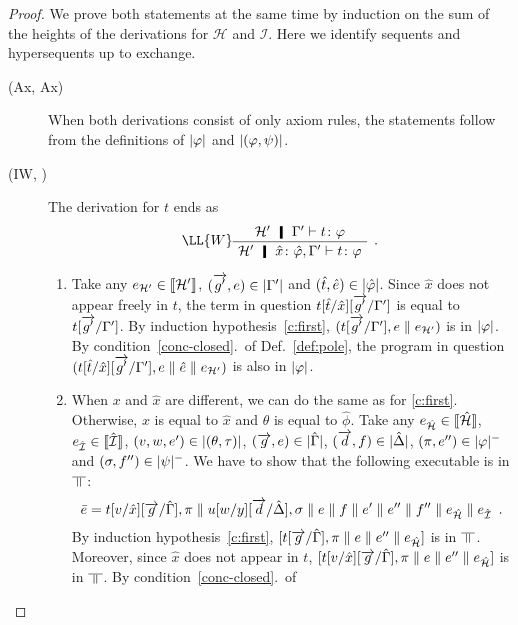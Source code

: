 \begin{proof}
 We prove both statements at the same time by induction on the sum of
 the heights of the derivations for $\mathcal H$ and $\mathcal I$.  Here
 we identify sequents and hypersequents up to exchange.
  \begin{description}
  \item[(Ax, Ax)] When both derivations consist of only axiom rules,
       the statements follow from the definitions of $|{\varphi}|$ and
       $|{(\varphi,\psi)}|$.
   \item[(IW, \textminus)]
	The derivation for $t$ ends as
	\[
	 \aseq{\hyp'\G'}{\tj{t}{\phi}}
	\LL{W}
	\useq{\hyp'\tj{\hat{x}}{\hat{\phi}}, \G'}{\tj{t}{\phi}}
	\DisplayProof\enspace.
	\]
	\begin{enumerate}[label=\textit{(\arabic{*})}]
	 \item Take any
	       $e_{\mathcal{H'}}\in \llbracket{\mathcal{H'}}\rrbracket$,
	       $(\overrightarrow{g'}, e)\in|{\Gamma'}|$ and $(\hat t,\hat
	       e)\in|{\hat{\varphi}}|$.
	       Since $\hat x$ does not appear freely in $t$,
	       the term in question $t[\hat t/\hat x][\overrightarrow{g'}/\Gamma']$ is
	       equal to $t[\overrightarrow{g'}/\Gamma']$.
	       By induction hypothesis~\ref{c:first},
	       $(t[\overrightarrow{g'}/\Gamma'],e\parallel e_{\mathcal H'})$ is in $|{\varphi}|$.
	       By condition~\ref{conc-closed}.~of Def.~\ref{def:pole},
	       the program in question $(t[\hat t/\hat x][\overrightarrow{g'}/\Gamma'],
	       e\parallel \hat e\parallel e_{\mathcal H'})$ is also in $|{\varphi}|$.
	 \item
	       When $x$ and $\hat x$ are different, we can do the same
	      as for \ref{c:first}.
	      Otherwise, $x$ is equal to $\hat x$ and $\theta$ is equal
	      to $\hat\phi$.
	      Take any
	      $e_{\hat{\mathcal{H}}}\in \llbracket{\hat{\mathcal{H}}}\rrbracket$,
	      $e_{\hat{\mathcal{I}}}\in \llbracket{\hat{\mathcal{I}}}\rrbracket$,
	      $(v,w,e')\in|{(\theta,\tau)}|$,
	      $(\overrightarrow g,e)\in|{\hat{\Gamma}}|$,
	      $(\overrightarrow d,f)\in|{\hat{\Delta}}|$,
	      $(\pi,e'')\in|{\varphi}|^-$ and
	      $(\sigma,f'')\in|{\psi}|^-$.
	      We have to show that the following executable is in
	      $\bbot$:
	      \[
	       \bar e = t[v/\hat x][\overrightarrow{g}/\hat{\Gamma}],\pi\parallel
	      u[w/y][\overrightarrow d/\hat {\Delta}], \sigma\parallel e\parallel f\parallel e'\parallel
	      e''\parallel f''\parallel e_{\hat{\mathcal{H}}}\parallel e_{\hat{\mathcal{I}}}\enspace.
	      \]
	      By induction hypothesis~\ref{c:first},
	      $
	       [t[\overrightarrow g/\hat {\Gamma}],\pi\parallel e\parallel e''\parallel e_{\hat{\mathcal{H}}}]
	      $
	      is in $\bbot$.  Moreover, since $\hat x$ does not appear
	      in $t$,  $[t[v/\hat x][\overrightarrow g/\hat {\Gamma}],\pi\parallel e\parallel
	      e''\parallel e_{\hat{\mathcal{H}}}]$
	      is in $\bbot$.  By condition~\ref{conc-closed}.~of

\end{enumerate}
\end{description}
\end{proof}
